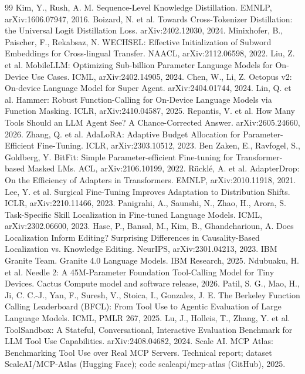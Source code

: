 \documentclass{article}
\begin{document}
\begin{thebibliography}{99}
 Kim, Y., Rush, A. M. Sequence-Level Knowledge Distillation. EMNLP, arXiv:1606.07947, 2016.
 Boizard, N. et al. Towards Cross-Tokenizer Distillation: the Universal Logit Distillation Loss. arXiv:2402.12030, 2024.
 Minixhofer, B., Paischer, F., Rekabsaz, N. WECHSEL: Effective Initialization of Subword Embeddings for Cross-lingual Transfer. NAACL, arXiv:2112.06598, 2022.
 Liu, Z. et al. MobileLLM: Optimizing Sub-billion Parameter Language Models for On-Device Use Cases. ICML, arXiv:2402.14905, 2024.
 Chen, W., Li, Z. Octopus v2: On-device Language Model for Super Agent. arXiv:2404.01744, 2024.
 Lin, Q. et al. Hammer: Robust Function-Calling for On-Device Language Models via Function Masking. ICLR, arXiv:2410.04587, 2025.
 Repantis, V. et al. How Many Tools Should an LLM Agent See? A Chance-Corrected Answer. arXiv:2605.24660, 2026.
 Zhang, Q. et al. AdaLoRA: Adaptive Budget Allocation for Parameter-Efficient Fine-Tuning. ICLR, arXiv:2303.10512, 2023.
 Ben Zaken, E., Ravfogel, S., Goldberg, Y. BitFit: Simple Parameter-efficient Fine-tuning for Transformer-based Masked LMs. ACL, arXiv:2106.10199, 2022.
 R\"uckl\'e, A. et al. AdapterDrop: On the Efficiency of Adapters in Transformers. EMNLP, arXiv:2010.11918, 2021.
 Lee, Y. et al. Surgical Fine-Tuning Improves Adaptation to Distribution Shifts. ICLR, arXiv:2210.11466, 2023.
 Panigrahi, A., Saunshi, N., Zhao, H., Arora, S. Task-Specific Skill Localization in Fine-tuned Language Models. ICML, arXiv:2302.06600, 2023.
 Hase, P., Bansal, M., Kim, B., Ghandeharioun, A. Does Localization Inform Editing? Surprising Differences in Causality-Based Localization vs. Knowledge Editing. NeurIPS, arXiv:2301.04213, 2023.
 IBM Granite Team. Granite 4.0 Language Models. IBM Research, 2025.
 Ndubuaku, H. et al. Needle 2: A 45M-Parameter Foundation Tool-Calling Model for Tiny Devices. Cactus Compute model and software release, 2026.
 Patil, S. G., Mao, H., Ji, C. C.-J., Yan, F., Suresh, V., Stoica, I., Gonzalez, J. E. The Berkeley Function Calling Leaderboard (BFCL): From Tool Use to Agentic Evaluation of Large Language Models. ICML, PMLR 267, 2025.
 Lu, J., Holleis, T., Zhang, Y. et al. ToolSandbox: A Stateful, Conversational, Interactive Evaluation Benchmark for LLM Tool Use Capabilities. arXiv:2408.04682, 2024.
 Scale AI. MCP Atlas: Benchmarking Tool Use over Real MCP Servers. Technical report; dataset ScaleAI/MCP-Atlas (Hugging Face); code scaleapi/mcp-atlas (GitHub), 2025.

\end{thebibliography}
\end{document}
